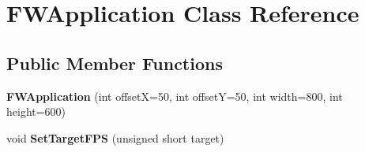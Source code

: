 \hypertarget{class_f_w_application}{\section{F\+W\+Application Class Reference}
\label{class_f_w_application}
}
\subsection*{Public Member Functions}
\begin{DoxyCompactItemize}
\item 
\hypertarget{class_f_w_application_a9d9ae1cd8e16ecb6c31990c39629067f}{{\bfseries F\+W\+Application} (int offset\+X=50, int offset\+Y=50, int width=800, int height=600)}\label{class_f_w_application_a9d9ae1cd8e16ecb6c31990c39629067f}

\item 
\hypertarget{class_f_w_application_a109e3927f7da9c5301fd5512f64178f2}{void {\bfseries Set\+Target\+F\+P\+S} (unsigned short target)}\label{class_f_w_application_a109e3927f7da9c5301fd5512f64178f2}


\end{DoxyCompactItemize}
